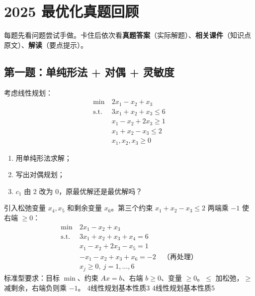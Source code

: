 
\section*{2025 最优化真题回顾}

{每题先看问题尝试手做。卡住后依次看\textbf{真题答案}（实际解题）、\textbf{相关课件}（知识点原文）、\textbf{解读}（要点提示）。}

\subsection*{第一题：单纯形法 + 对偶 + 灵敏度}

\noindent 考虑线性规划：
\[
\begin{aligned}
\min\ & 2x_1 - x_2 + x_3 \\
\text{s.t.}\ & 3x_1 + x_2 + x_3 \le 6 \\
& x_1 - x_2 + 2x_3 \ge 1 \\
& x_1 + x_2 - x_3 \le 2 \\
& x_1, x_2, x_3 \ge 0
\end{aligned}
\]
\begin{enumerate}
  \item[(1)] 用单纯形法求解；
  \item[(2)] 写出对偶规划；
  \item[(3)] $c_1$ 由 2 改为 0，原最优解还是最优解吗？
\end{enumerate}

  {引入松弛变量 $x_4,x_5$ 和剩余变量 $x_6$。第三个约束 $x_1+x_2-x_3\le 2$ 两端乘 $-1$ 使右端 $\ge 0$：
  \begin{align*}
    \min\ & 2x_1 - x_2 + x_3 \\
    \text{s.t.}\ & 3x_1 + x_2 + x_3 + x_4 = 6 \\
    & x_1 - x_2 + 2x_3 - x_5 = 1 \\
    & -x_1 - x_2 + x_3 + x_6 = -2 \quad\text{（再处理）}\\
    & x_j \ge 0,\ j=1,\dots,6
  \end{align*}}
  {标准型要求：目标 $\min$、约束 $Ax=b$、右端 $b\ge 0$、变量 $\ge 0$。$\le$ 加松弛，$\ge$ 减剩余，右端负则乘 $-1$。}
  {4线性规划基本性质}{3}
  {4线性规划基本性质}{5}

